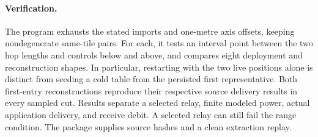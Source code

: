 \documentclass{article}
\begin{document}
\paragraph{Verification.}
The program exhausts the stated imports and one-metre axis offsets,
keeping nondegenerate same-tile pairs. For each, it tests an interval
point between the two hop lengths and controls below and above,
and compares eight deployment and reconstruction shapes. In
particular, restarting with the two live positions alone is distinct
from seeding a cold table from the persisted first representative.
Both first-entry reconstructions reproduce their respective source
delivery results in every sampled cut. Results separate a selected
relay, finite modeled power, actual application delivery, and receive
debit. A selected relay can still fail the range condition. The
package supplies source hashes and a clean extraction replay.
\end{document}
